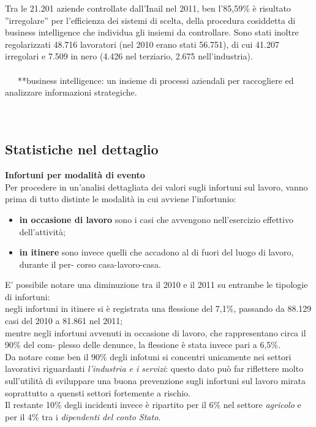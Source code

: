Tra le 21.201 aziende controllate dall'Inail nel 2011, ben l’85,59\% è risultato ''irregolare'' per l’efficienza dei sistemi di scelta, della procedura cosiddetta di business intelligence che individua gli insiemi da controllare. Sono stati inoltre regolarizzati 48.716 lavoratori (nel 2010 erano stati 56.751), di cui 41.207 irregolari e 7.509 in nero (4.426 nel terziario, 2.675 nell’industria).\\\\



\
\
\
**business intelligence: un insieme di processi aziendali per raccogliere ed analizzare informazioni strategiche.\\\\

\ \
\subsection{Statistiche nel dettaglio}

\textbf{Infortuni per modalità di evento}\\
Per procedere in un’analisi dettagliata dei valori sugli infortuni sul lavoro, vanno prima di tutto distinte le modalità in cui avviene l’infortunio:

\begin{itemize}
\item \textbf{in occasione di lavoro} sono i casi che avvengono nell’esercizio effettivo dell’attività;
\item \textbf{in itinere} sono invece quelli che accadono al di fuori del luogo di lavoro, durante il per-
corso casa-lavoro-casa.
\end{itemize}


E' possibile notare una diminuzione tra il 2010 e il 2011 su entrambe le tipologie di infortuni:\\
negli infortuni in itinere si è registrata una flessione del 7,1\%, passando da 88.129 casi del 2010 a 81.861 nel 2011;\\
mentre negli infortuni avvenuti in occasione di lavoro, che rappresentano circa il 90\% del com-
plesso delle denunce, la flessione è stata invece pari a 6,5\%.\\
Da notare come ben il 90\% degli infotuni si concentri unicamente nei settori lavorativi riguardanti \textit{l'industria e i servizi}: questo dato può far riflettere molto sull'utilità di sviluppare una buona prevenzione sugli infortuni sul lavoro mirata soprattutto a quensti settori fortemente a rischio.\\
Il restante 10\% degli incidenti invece è ripartito per il 6\% nel settore \textit{agricolo} e per il 4\% tra i \textit{dipendenti del conto Stato}.


